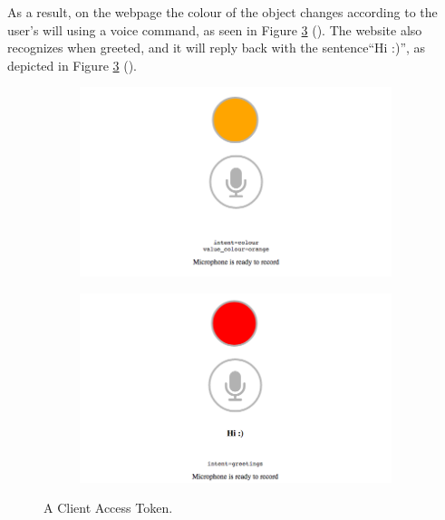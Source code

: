 \documentclass[twoside,11pt]{article}
\begin{document}
As a result, on the webpage the colour of the object changes according to the user's will using a voice command, as seen in Figure \ref{fig:webwit} ().
The website also recognizes when greeted, and it will reply back with the sentence``Hi :)'', as depicted in Figure \ref{fig:webwit} ().


\begin{figure}[h]
\begin{center}
	\begin{subfigure}[t]{0.48\columnwidth}
	\begin{center}
   		\includegraphics[width=\columnwidth]{figures/witapp_colour.png}
   		\caption{}
   		\label{fig:colour}
   	\end{center}
   \end{subfigure}
   \hfill
   \begin{subfigure}[t]{0.48\columnwidth}
	\begin{center}
   		\includegraphics[width=\columnwidth]{figures/witapp_greetings.png}
   		\caption{}
   		\label{fig:greeting}
   	\end{center}
   \end{subfigure}
    \caption{A Client Access Token.}
    \label{fig:webwit}
\end{center}
\end{figure}
\end{document}
